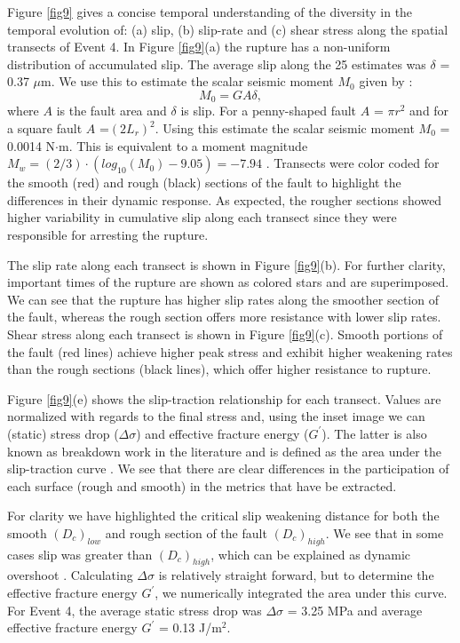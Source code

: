 \documentclass[preprint,1p, 10pt,authoryear]{elsarticle}
\begin{document}
Figure \ref{fig9} gives a concise temporal understanding of the diversity in the temporal evolution of: (a) slip, (b) slip-rate and (c) shear stress along the spatial transects of Event 4. In Figure \ref{fig9}(a) the rupture has a non-uniform distribution of accumulated slip. The average slip along the 25 estimates was $\delta$ = 0.37 $\mu$m.  We use this to estimate the scalar seismic moment $M_{0}$ given by \citet{Aki1966}: 
\begin{equation}
M_{0} = G A \delta, 
\label{eq9}
\end{equation}
\noindent where $A$ is the fault area and $\delta$ is slip. For a penny-shaped fault $A$ = $\pi r^{2}$ and for a square fault $A$ =$(2L_{r})^{2}$. Using this estimate the scalar seismic moment $M_{0}$ = 0.0014 N$\cdot$m. This is equivalent to a moment magnitude $M_{w} = (2/3)\cdot(log_{10}(M_{0})-9.05) = -7.94$ \citep{Kanamori1975}.  Transects were color coded for the smooth (red) and rough (black) sections of the fault to highlight the differences in their dynamic response. As expected, the rougher sections showed higher variability in cumulative slip along each transect since they were responsible for arresting the rupture.    

The slip rate along each transect is shown in Figure \ref{fig9}(b). For further clarity, important times of the rupture are shown as colored stars and are superimposed. We can see that the rupture has higher slip rates along the smoother section of the fault, whereas the rough section offers more resistance with lower slip rates. Shear stress along each transect is shown in Figure \ref{fig9}(c). Smooth portions of the fault (red lines) achieve higher peak stress and exhibit higher weakening rates than the rough sections (black lines), which offer higher resistance to rupture.

Figure \ref{fig9}(e) shows the slip-traction relationship for each transect. Values are normalized with regards to the final stress and, using the inset image we can (static) stress drop ($\Delta\sigma$) and effective fracture energy ($G^{'}$).  The latter is also known as breakdown work in the literature \citep[e.g.,][]{Tinti2005, Cocco2016} and is defined as the area under the slip-traction curve . We see that there are clear differences in the participation of each surface (rough and smooth) in the metrics that have be extracted. 

For clarity we have highlighted the critical slip weakening distance for both the smooth $(D_{c})_{low}$ and rough section of the fault $(D_{c})_{high}$. We see that in some cases slip was greater than $(D_{c})_{high}$, which can be explained as dynamic overshoot \citep{Madariaga1976}. Calculating $\Delta \sigma$ is relatively straight forward, but to determine the effective fracture energy $G^{'}$, we numerically integrated the area under this curve. For Event 4, the average static stress drop was $\Delta\sigma$ = 3.25 MPa and average effective fracture energy $G^{'}$ = 0.13 J/m$^{2}$.  
\end{document}
